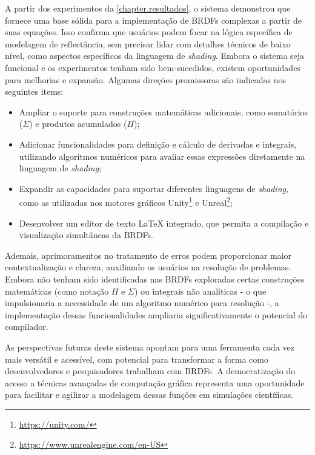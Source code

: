 
A partir dos experimentos da \autoref{chapter.resultados}, o sistema demonstrou que fornece uma base sólida para a implementação de BRDFs complexas a partir de suas equações. Isso confirma que usuários podem focar na lógica específica de modelagem de reflectância, sem precisar lidar com detalhes técnicos de baixo nível, como aspectos específicos da linguagem de \textit{shading}. Embora o sistema seja funcional e os experimentos tenham sido bem-sucedidos, existem oportunidades para melhorias e expansão. Algumas direções promissoras são indicadas nos seguintes items:

\begin{itemize}
    \item Ampliar o suporte para construções matemáticas adicionais, como somatórios ($\Sigma$) e produtos acumulados ($\Pi$);
    \label{items-melhorias}
    \item Adicionar funcionalidades para definição e cálculo de derivadas e integrais, utilizando algoritmos numéricos para avaliar essas expressões diretamente na linguagem de \textit{shading};
    \item Expandir as capacidades para suportar diferentes linguagens de \textit{shading}, como as utilizadas nos motores gráficos Unity\footnote{\url{https://unity.com/}} e Unreal\footnote{\url{https://www.unrealengine.com/en-US}};
    \item Desenvolver um editor de texto \LaTeX{} integrado, que permita a compilação e visualização simultâneas da BRDFs.
\end{itemize}

Ademais, aprimoramentos no tratamento de erros podem proporcionar maior contextualização e clareza, auxiliando os usuários na resolução de problemas. Embora não tenham sido identificadas nas BRDFs exploradas certas construções matemáticas (como notação $\Pi$ e $\Sigma$) ou integrais não analíticas - o que impulsionaria a necessidade de um algoritmo numérico para resolução -, a implementação dessas funcionalidades ampliaria significativamente o potencial do compilador.

As perspectivas futuras deste sistema apontam para uma ferramenta cada vez mais versátil e acessível, com potencial para transformar a forma como desenvolvedores e pesquisadores trabalham com BRDFs. A democratização do acesso a técnicas avançadas de computação gráfica representa uma oportunidade para facilitar e agilizar a modelagem dessas funções em simulações científicas.
